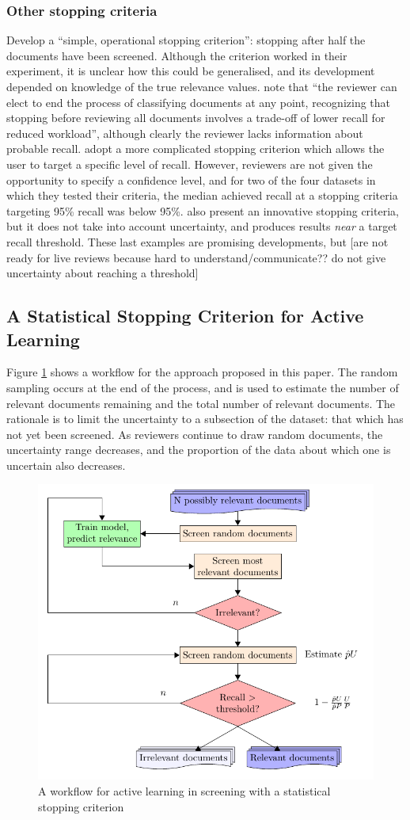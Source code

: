 \documentclass{bmcart}
\begin{document}
\subsubsection*{Other stopping criteria}

\cite{Wallace2010a} Develop a ``simple, operational stopping criterion'': stopping after half the documents have been screened. Although the criterion worked in their experiment, it is unclear how this could be generalised, and its development depended on knowledge of the true relevance values. 
\cite{Jonnalagadda2013} note that ``the reviewer can elect to end the process of classifying documents at any point, recognizing that stopping before reviewing all documents involves a trade-off of lower recall for reduced workload'', although clearly the reviewer lacks information about probable recall.
\cite{Yu2019} adopt a more complicated stopping criterion  which allows the user to target a specific level of recall. However, reviewers are not given the opportunity to specify a confidence level, and for two of the four datasets in which they tested their criteria, the median achieved recall at a stopping criteria targeting 95\% recall was below 95\%. \cite{DiNunzio2018} also present an innovative stopping criteria, but it does not take into account uncertainty, and produces results \textit{near} a target recall threshold. 
These last examples are promising developments, but [are not ready for live reviews because hard to understand/communicate?? do not give uncertainty about reaching a threshold]



\subsection*{A Statistical Stopping Criterion for Active Learning}
	Figure \ref{flow} shows a workflow for the approach proposed in this paper. 
	The random sampling occurs at the end of the process, and is used to estimate the number of relevant documents remaining and the total number of relevant documents. 
	The rationale is to limit the uncertainty to a subsection of the dataset: that which has not yet been screened. 
	As reviewers continue to draw random documents, the uncertainty range decreases, and the proportion of the data about which one is uncertain also decreases.
	
	\begin{figure}
		\includegraphics[width=0.5\linewidth]{../images/flow}
		\caption{A workflow for active learning in screening with a statistical stopping criterion}
		\label{flow}
	\end{figure}
	
\end{document}
